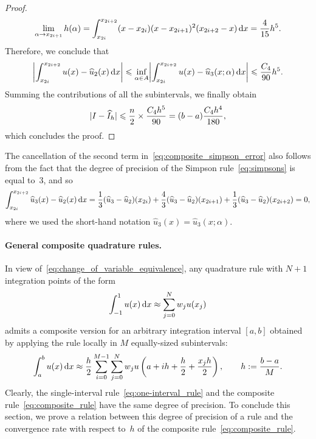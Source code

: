 \begin{proof}
\[
    \lim_{\alpha \to x_{2i+1}} h(\alpha) =
    \int_{x_{2i}}^{x_{2i+2}} (x-x_{2i})(x- x_{2i+1})^2 (x_{2i+2} - x) \, \mathrm d x = \frac{4}{15} h^5.
\]
Therefore, we conclude that
\[
    \abs*{\int_{x_{2i}}^{x_{2i+2}} u(x) - \widehat u_2(x)  \, \d x}
    \leq \inf_{\alpha \in A} \abs*{\int_{x_{2i}}^{x_{2i+2}} u(x) - \widehat u_3(x; \alpha)  \, \d x} \leq \frac{C_4}{90} h^5.
\]
Summing the contributions of all the subintervals,
we finally obtain
\begin{equation}
    \label{eq:scaling_error}
    \lvert I - \widehat I_h\rvert \leqslant  \frac{n}{2} \times \frac{C_4 h^5}{90} = (b-a)\frac{C_4 h^4}{180},
\end{equation}
which concludes the proof.
\end{proof}

\begin{remark}
The cancellation of the second term in~\eqref{eq:composite_simpson_error} also follows from the fact that
the degree of precision of the Simpson rule~\eqref{eq:simpsons} is equal to~3,
and so
\[
    \int_{x_{2i}}^{x_{2i+2}} \widehat u_3(x) - \widehat u_2(x)  \, \mathrm d x = \frac{1}{3} (\widehat u_3 - \widehat u_2)(x_{2i}) + \frac{4}{3} (\widehat u_3 - \widehat u_2)(x_{2i+1}) + \frac{1}{3} (\widehat u_3 - \widehat u_2)(x_{2i+2}) = 0,
\]
where we used the short-hand notation $\widehat u_3(x) = \widehat u_3(x; \alpha)$.
\end{remark}

\paragraph{General composite quadrature rules.}%
\label{par:General_composite_quadrature_rules}
In view of~\eqref{eq:change_of_variable_equivalence},
any quadrature rule with $N + 1$ integration points of the form
\begin{equation}
    \label{eq:one-interval_rule}
    \int_{-1}^{1} u(x) \, \mathrm d x
    \approx \sum_{j=0}^{N} w_j u(x_j)
\end{equation}
admits a composite version for an arbitrary integration interval $[a, b]$ obtained by applying the rule locally in $M$ equally-sized subintervals:
\begin{equation}
    \label{eq:composite_rule}
    \int_{a}^{b} u(x) \, \mathrm d x
    \approx \frac{h}{2} \sum_{i=0}^{M - 1} \sum_{j=0}^{N} w_j u \left( a + ih + \frac{h}{2} + \frac{x_j h}{2} \right), 
    \qquad h := \frac{b - a}{M}.
\end{equation}
Clearly, the single-interval rule~\eqref{eq:one-interval_rule} and the composite rule~\eqref{eq:composite_rule} have the same degree of precision.
To conclude this section,
we prove a relation between this degree of precision of a rule and 
the convergence rate with respect to~$h$ of the composite rule~\eqref{eq:composite_rule}.

